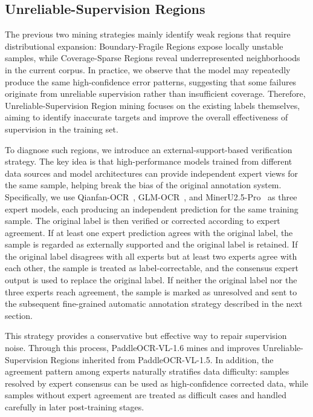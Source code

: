 \documentclass[11pt, a4paper,logo,  copyright, nonumbering]{paddleocr}
\begin{document}
\subsection{Unreliable-Supervision Regions}

The previous two mining strategies mainly identify weak regions that require distributional expansion: Boundary-Fragile Regions expose locally unstable samples, while Coverage-Sparse Regions reveal underrepresented neighborhoods in the current corpus. In practice, we observe that the model may repeatedly produce the same high-confidence error patterns, suggesting that some failures originate from unreliable supervision rather than insufficient coverage. Therefore, Unreliable-Supervision Region mining focuses on the existing labels themselves, aiming to identify inaccurate targets and improve the overall effectiveness of supervision in the training set.

To diagnose such regions, we introduce an external-support-based verification strategy. The key idea is that high-performance models trained from different data sources and model architectures can provide independent expert views for the same sample, helping break the bias of the original annotation system. Specifically, we use Qianfan-OCR~\cite{QianfanOCR}, GLM-OCR~\cite{duan2026glmocrtechnicalreport}, and MinerU2.5-Pro~\cite{MinerU25Pro} as three expert models, each producing an independent prediction for the same training sample. The original label is then verified or corrected according to expert agreement. If at least one expert prediction agrees with the original label, the sample is regarded as externally supported and the original label is retained. If the original label disagrees with all experts but at least two experts agree with each other, the sample is treated as label-correctable, and the consensus expert output is used to replace the original label. If neither the original label nor the three experts reach agreement, the sample is marked as unresolved and sent to the subsequent fine-grained automatic annotation strategy described in the next section.

This strategy provides a conservative but effective way to repair supervision noise. Through this process, PaddleOCR-VL-1.6 mines and improves Unreliable-Supervision Regions inherited from PaddleOCR-VL-1.5. In addition, the agreement pattern among experts naturally stratifies data difficulty: samples resolved by expert consensus can be used as high-confidence corrected data, while samples without expert agreement are treated as difficult cases and handled carefully in later post-training stages.
\end{document}
